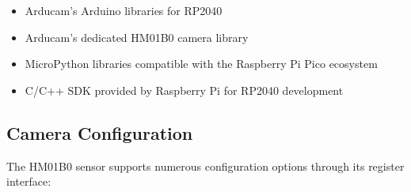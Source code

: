 \begin{itemize}
    
    
    
    \item Arducam's Arduino libraries for RP2040 \cite{Arducam:2022}
    
    
    
    \item Arducam's dedicated HM01B0 camera library
    
    
    
    \item MicroPython libraries compatible with the Raspberry Pi Pico ecosystem
    
    
    
    \item C/C++ SDK provided by Raspberry Pi for RP2040 development \cite{RaspberryPi:2020a}
    
    
    
\end{itemize}







\subsection{Camera Configuration}



The HM01B0 sensor supports numerous configuration options through its register interface:



